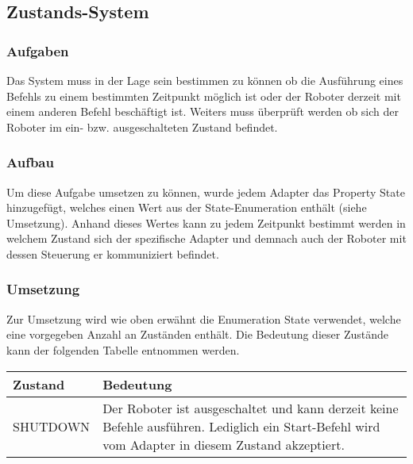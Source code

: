 
\subsection{Zustands-System}

\subsubsection{Aufgaben}
Das System muss in der Lage sein bestimmen zu können ob die Ausführung eines Befehls zu einem bestimmten Zeitpunkt möglich ist oder der Roboter derzeit mit einem anderen Befehl beschäftigt ist. Weiters muss überprüft werden ob sich der Roboter im ein- bzw. ausgeschalteten Zustand befindet.

\subsubsection{Aufbau}
Um diese Aufgabe umsetzen zu können, wurde jedem Adapter das Property State hinzugefügt, welches einen Wert aus der State-Enumeration enthält (siehe Umsetzung). Anhand dieses Wertes kann zu jedem Zeitpunkt bestimmt werden in welchem Zustand sich der spezifische Adapter und demnach auch der Roboter mit dessen Steuerung er kommuniziert befindet.

\subsubsection{Umsetzung}
Zur Umsetzung wird wie oben erwähnt die Enumeration State verwendet, welche eine vorgegeben Anzahl an Zuständen enthält. Die Bedeutung dieser Zustände kann der folgenden Tabelle entnommen werden.

\begin{tabular}{|p{4cm}|p{10cm}|}
\hline
\textbf{Zustand} & \textbf{Bedeutung}\\
\hline
SHUTDOWN & Der Roboter ist ausgeschaltet und kann derzeit keine Befehle ausführen. Lediglich ein Start-Befehl wird vom Adapter in diesem Zustand akzeptiert.\\
\hline
\end{tabular}
